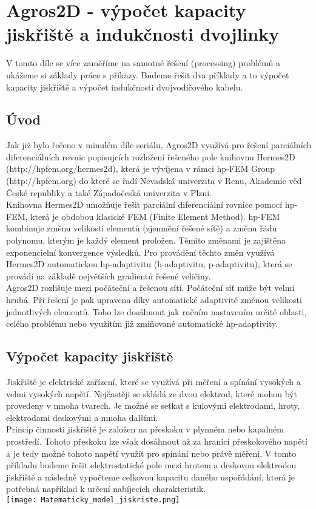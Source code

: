 \documentclass[a4paper, oneside]{article}
\begin{document}
\author{Bc. František MACH, Ing. Pavel Karban, Ph.D.}
\date{\today}
\section{Agros2D - výpočet kapacity jiskřiště a indukčnosti dvojlinky}
\indent V tomto díle se více zaměříme na samotné řešení (processing) problémů a ukážeme si základy práce s příkazy. Budeme řešit dva příklady a to výpočet kapacity jiskřiště a výpočet indukčnosti dvojvodičového kabelu.
\tableofcontents
 \subsection{Úvod}
\indent Jak již bylo řečeno v minulém díle seriálu, Agros2D využívá pro řešení parciálních diferenciálních rovnic popisujcích rozložení řešeného pole knihovnu Hermes2D \\(http://hpfem.org/hermes2d), která je vývíjena v rámci hp-FEM Group \\(http://hpfem.org) do které se řadí Nevadská univerzita v Renu, Akademie věd České republiky a také Západočeská univerzita v Plzni.\\
\indent Knihovna Hermes2D umožňuje řešit parciální diferenciální rovnice pomocí hp-FEM, která je obdobou klasické FEM (Finite Element Method). hp-FEM kombinuje změnu velikosti elementů (zjemnění řešené sítě) a změnu řádu polynomu, kterým je každý element proložen. Těmito změnami je zajištěna exponencielní konvergence výsledků. Pro provádění těchto změn využívá Hermes2D automatickou hp-adaptivitu (h-adaptivitu, p-adaptivitu), která se provádí na základě největších gradientů řešené veličiny.\\
\indent Agros2D rozlišuje mezi počáteční a řešenou sítí. Počáteční síť může být velmi hrubá. Při řešení je pak upravena díky automatické adaptivitě změnou velikosti jednotlivých elementů. Toho lze dosáhnout jak ručním nastavením určité oblasti, celého problému nebo využitím již zmiňované automatické hp-adaptivity.\\
\newpage
\subsection{Výpočet kapacity jiskřiště} 
\indent Jiskřiště je elektrické zařízení, které se využívá při měření a spínání vysokých a velmi vysokých napětí. Nejčastěji se skládá ze dvou elektrod, které mohou být provedeny v mnoha tvarech. Je možné se setkat s kulovými elektrodami, hroty, elektrodami deskovými a mnoha dalšími.\\
Princip činnosti jiskřiště je založen na přeskoku v plynném nebo kapalném prostředí. Tohoto přeskoku lze však dosáhnout až za hranicí přeskokového napětí a je tedy možné tohoto napětí využít pro spínání nebo právě měření. V tomto příkladu budeme řešit elektrostatické pole mezi hrotem a deskovou elektrodou jiskřiště a následně vypočteme celkovou kapacitu daného uspořádání, která je potřebná například k určení nabíjecích charakteristik.\\
\texttt{[image: Matematicky\_model\_jiskriste.png]}\\
\end{document}
